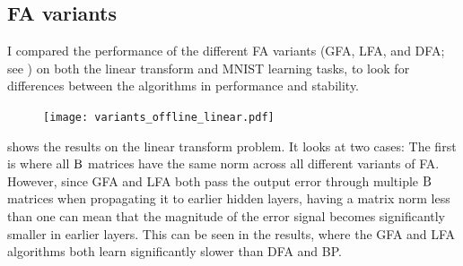 \subsection{FA variants}

I compared the performance of the different FA variants
(GFA, LFA, and DFA; see )
on both the linear transform and MNIST learning tasks,
to look for differences between the algorithms in performance and stability.

\begin{figure}
  \centering
  \texttt{[image: variants\_offline\_linear.pdf]}
\end{figure}

 shows the results on the linear transform problem.
It looks at two cases:
The first is where all $\mathrm{B}$ matrices have the same norm
across all different variants of FA.
However, since GFA and LFA both pass the output error through multiple
$\mathrm{B}$ matrices when propagating it to earlier hidden layers,
having a matrix norm less than one can mean that the magnitude of the error signal
becomes significantly smaller in earlier layers.
This can be seen in the results, where the GFA and LFA algorithms
both learn significantly slower than DFA and BP.


